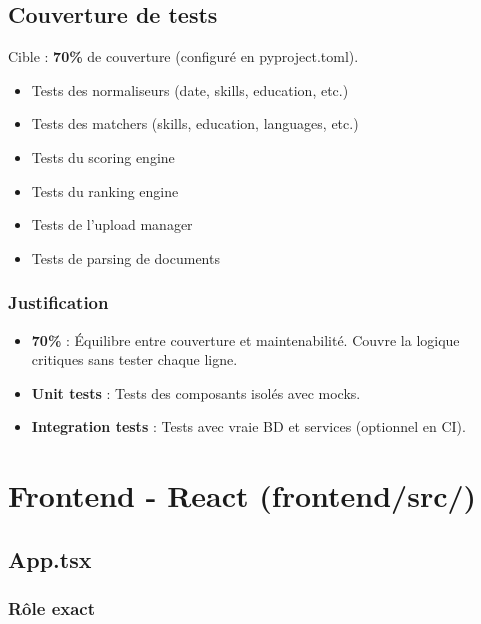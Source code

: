 \documentclass[12pt,a4paper,oneside]{book}
\begin{document}
\subsection{Couverture de tests}

Cible : \textbf{70\%} de couverture (configuré en pyproject.toml).

\begin{itemize}
    \item Tests des normaliseurs (date, skills, education, etc.)
    \item Tests des matchers (skills, education, languages, etc.)
    \item Tests du scoring engine
    \item Tests du ranking engine
    \item Tests de l'upload manager
    \item Tests de parsing de documents
\end{itemize}

\subsubsection{Justification}

\begin{itemize}
    \item \textbf{70\%} : Équilibre entre couverture et maintenabilité. Couvre la logique critiques sans tester chaque ligne.
    
    \item \textbf{Unit tests} : Tests des composants isolés avec mocks.
    
    \item \textbf{Integration tests} : Tests avec vraie BD et services (optionnel en CI).
\end{itemize}

\newpage


\section{Frontend - React (frontend/src/)}

\subsection{App.tsx}

\subsubsection{Rôle exact}
\end{document}

